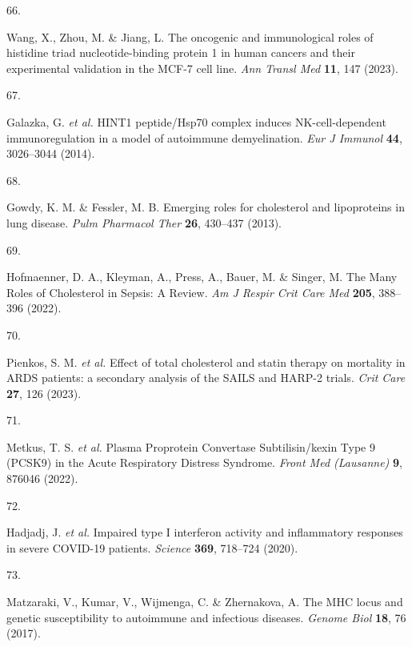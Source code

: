 \documentclass[
  11,
  a4paper,
]{article}
\newlength{\cslhangindent}
\newlength{\csllabelwidth}
\newlength{\cslentryspacingunit} %
\newenvironment{CSLReferences}[2] %
 {%
  \setlength{\parindent}{0pt}
  \ifodd #1
  \let\oldpar\par
  \def\par{\hangindent=\cslhangindent\oldpar}
  \fi
  \setlength{\parskip}{#2\cslentryspacingunit}
 }%
 {}
\newcommand{\CSLLeftMargin}[1]{\parbox[t]{\csllabelwidth}{#1}}
\newcommand{\CSLRightInline}[1]{\parbox[t]{\linewidth - \csllabelwidth}{#1}\break}
\begin{document}
\begin{CSLReferences}{0}{0}
\leavevmode{}%
\CSLLeftMargin{66. }%
\CSLRightInline{Wang, X., Zhou, M. \& Jiang, L. {{T}he oncogenic and
immunological roles of histidine triad nucleotide-binding protein 1 in
human cancers and their experimental validation in the {M}{C}{F}-7 cell
line}. \emph{Ann Transl Med} \textbf{11}, 147 (2023).}

\leavevmode{}%
\CSLLeftMargin{67. }%
\CSLRightInline{Galazka, G. \emph{et al.} {{H}{I}{N}{T}1 peptide/{H}sp70
complex induces {N}{K}-cell-dependent immunoregulation in a model of
autoimmune demyelination}. \emph{Eur J Immunol} \textbf{44}, 3026--3044
(2014).}

\leavevmode{}%
\CSLLeftMargin{68. }%
\CSLRightInline{Gowdy, K. M. \& Fessler, M. B. {{E}merging roles for
cholesterol and lipoproteins in lung disease}. \emph{Pulm Pharmacol
Ther} \textbf{26}, 430--437 (2013).}

\leavevmode{}%
\CSLLeftMargin{69. }%
\CSLRightInline{Hofmaenner, D. A., Kleyman, A., Press, A., Bauer, M. \&
Singer, M. {{T}he {M}any {R}oles of {C}holesterol in {S}epsis: {A}
{R}eview}. \emph{Am J Respir Crit Care Med} \textbf{205}, 388--396
(2022).}

\leavevmode{}%
\CSLLeftMargin{70. }%
\CSLRightInline{Pienkos, S. M. \emph{et al.} {{E}ffect of total
cholesterol and statin therapy on mortality in {A}{R}{D}{S} patients: a
secondary analysis of the {S}{A}{I}{L}{S} and {H}{A}{R}{P}-2 trials}.
\emph{Crit Care} \textbf{27}, 126 (2023).}

\leavevmode{}%
\CSLLeftMargin{71. }%
\CSLRightInline{Metkus, T. S. \emph{et al.} {{P}lasma {P}roprotein
{C}onvertase {S}ubtilisin/kexin {T}ype 9 ({P}{C}{S}{K}9) in the {A}cute
{R}espiratory {D}istress {S}yndrome}. \emph{Front Med (Lausanne)}
\textbf{9}, 876046 (2022).}

\leavevmode{}%
\CSLLeftMargin{72. }%
\CSLRightInline{Hadjadj, J. \emph{et al.} {{I}mpaired type {I}
interferon activity and inflammatory responses in severe
{C}{O}{V}{I}{D}-19 patients}. \emph{Science} \textbf{369}, 718--724
(2020).}

\leavevmode{}%
\CSLLeftMargin{73. }%
\CSLRightInline{Matzaraki, V., Kumar, V., Wijmenga, C. \& Zhernakova, A.
{{T}he {M}{H}{C} locus and genetic susceptibility to autoimmune and
infectious diseases}. \emph{Genome Biol} \textbf{18}, 76 (2017).}


\end{CSLReferences}
\end{document}
